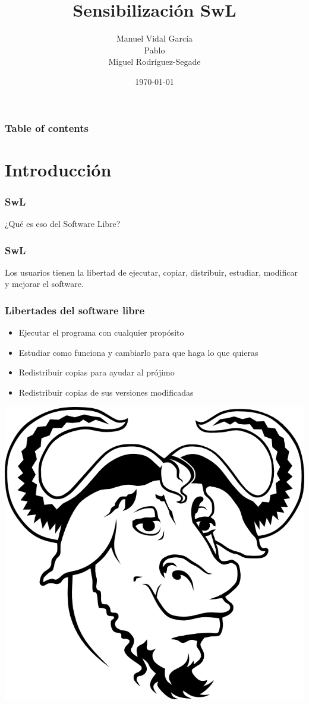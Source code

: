 \documentclass{beamer}
\title{Sensibilización SwL}
\author{Manuel Vidal García\\ Pablo \\ Miguel Rodríguez-Segade}
\date{\today}
\begin{document}
\begin{frame}
    \titlepage
\end{frame}

\begin{frame} \frametitle{Table of contents}
    \tableofcontents
\end{frame}


\section{Introducción}

\begin{frame}\frametitle{SwL}
    ¿Qué es eso del Software Libre?
\end{frame}


\begin{frame}\frametitle{SwL}

    Los usuarios tienen la libertad de ejecutar, copiar, distribuir, estudiar,
    modificar y mejorar el software.


\end{frame}

\begin{frame}\frametitle{Libertades del software libre}

    \begin{itemize}
        \item Ejecutar el programa con cualquier propósito \pause
        \item Estudiar como funciona y cambiarlo para que haga lo que quieras \pause
        \item Redistribuir copias para ayudar al prójimo \pause
        \item Redistribuir copias de sus versiones modificadas \pause
    \end{itemize}

    \begin{center}
    \includegraphics[scale=0.1]{figures/The_GNU_logo.png}
    \end{center}

\end{frame}
\end{document}
